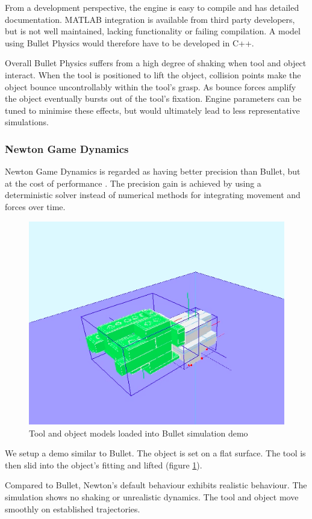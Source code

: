 \documentclass[11]{article}
\begin{document}
From a development perspective, the engine is easy to compile and has detailed documentation.
MATLAB integration is available from third party developers, but is not well maintained, lacking functionality or failing compilation.
A model using Bullet Physics would therefore have to be developed in C++. 

Overall Bullet Physics suffers from a high degree of shaking when tool and object interact. 
When the tool is positioned to lift the object, collision points make the object bounce uncontrollably within the tool's grasp. 
As bounce forces amplify the object eventually bursts out of the tool's fixation.  
Engine parameters can be tuned to minimise these effects, but would ultimately lead to less representative simulations. 

\subsubsection{Newton Game Dynamics}
Newton Game Dynamics is regarded as having better precision than Bullet, but at the cost of performance \cite{hummel2012}. 
The precision gain is achieved by using a deterministic solver instead of numerical methods for integrating movement and forces over time. 

\begin{figure}[h]
  \centering
  \includegraphics[width=.5\textwidth]{figures/newton_demo.png}
  \caption{Tool and object models loaded into Bullet simulation demo}
  \label{fig:newton_demo}
\end{figure}      

We setup a demo similar to Bullet.
The object is set on a flat surface. 
The tool is then slid into the object's fitting and lifted (figure \ref{fig:newton_demo}). 

Compared to Bullet, Newton's default behaviour exhibits realistic behaviour. 
The simulation shows no shaking or unrealistic dynamics.
The tool and object move smoothly on established trajectories. 
\end{document}
